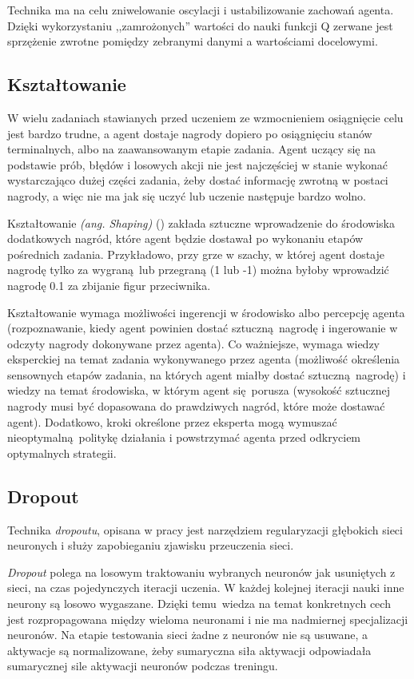 Technika ma na celu zniwelowanie oscylacji i ustabilizowanie zachowań agenta. Dzięki wykorzystaniu ,,zamrożonych'' wartości do nauki funkcji Q zerwane jest sprzężenie zwrotne pomiędzy zebranymi danymi a wartościami docelowymi.

\subsection{Kształtowanie}\label{shaping}
W wielu zadaniach stawianych przed uczeniem ze wzmocnieniem osiągnięcie celu jest bardzo trudne, a agent dostaje nagrody dopiero po osiągnięciu stanów terminalnych, albo na zaawansowanym etapie zadania. Agent uczący się na podstawie prób, błędów i losowych akcji nie jest najczęściej w stanie wykonać wystarczająco dużej części zadania, żeby dostać informację zwrotną w postaci nagrody, a więc nie ma jak się uczyć lub uczenie następuje bardzo wolno.

Kształtowanie \textit{(ang. Shaping)} (\cite{Mataric94rewardfunctions}) zakłada sztuczne wprowadzenie do środowiska dodatkowych nagród, które agent będzie dostawał po wykonaniu etapów pośrednich zadania. Przykładowo, przy grze w szachy, w której agent dostaje nagrodę tylko za wygraną lub przegraną (1 lub -1) można byłoby wprowadzić nagrodę 0.1 za zbijanie figur przeciwnika.

Kształtowanie wymaga możliwości ingerencji w środowisko albo percepcję agenta (rozpoznawanie, kiedy agent powinien dostać sztuczną nagrodę i ingerowanie w odczyty nagrody dokonywane przez agenta). Co ważniejsze, wymaga wiedzy eksperckiej na temat zadania wykonywanego przez agenta (możliwość określenia sensownych etapów zadania, na których agent miałby dostać sztuczną nagrodę) i wiedzy na temat środowiska, w którym agent się porusza (wysokość sztucznej nagrody musi być dopasowana do prawdziwych nagród, które może dostawać agent). Dodatkowo, kroki określone przez eksperta mogą wymuszać nieoptymalną politykę działania i powstrzymać agenta przed odkryciem optymalnych strategii.

\subsection{Dropout}\label{dropout}

Technika \textit{dropoutu}, opisana w pracy \cite{Srivastava:2014:DSW:2627435.2670313} jest narzędziem regularyzacji głębokich sieci neuronych i służy zapobieganiu zjawisku przeuczenia sieci.

\textit{Dropout} polega na losowym traktowaniu wybranych neuronów jak usuniętych z sieci, na czas pojedynczych iteracji uczenia. W każdej kolejnej iteracji nauki inne neurony są losowo wygaszane. Dzięki temu wiedza na temat konkretnych cech jest rozpropagowana między wieloma neuronami i nie ma nadmiernej specjalizacji neuronów. Na etapie testowania sieci żadne z neuronów nie są usuwane, a aktywacje są normalizowane, żeby sumaryczna siła aktywacji odpowiadała sumarycznej sile aktywacji neuronów podczas treningu.

